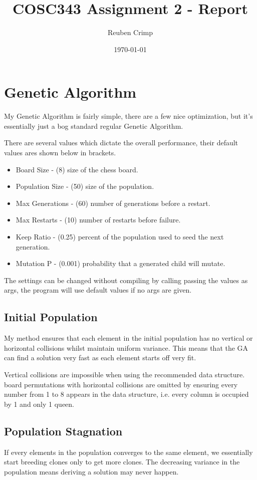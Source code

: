 \documentclass[a4paper,11pt]{article}
\title{COSC343 Assignment 2 - Report}
\author{Reuben Crimp}
\date{\today}
\begin{document}
\maketitle

\section*{Genetic Algorithm}
My Genetic Algorithm is fairly simple, there are a few nice optimization, but it's essentially just a bog standard regular Genetic Algorithm.

There are several values which dictate the overall performance, their default values ares shown below in brackets.
\begin{itemize}
\item Board Size - (8) size of the chess board.
\item Population Size - (50) size of the population.
\item Max Generations - (60) number of generations before a restart.
\item Max Restarts - (10) number of restarts before failure.
\item Keep Ratio - (0.25) percent of the population used to seed the next generation.
\item Mutation P - (0.001) probability that a generated child will mutate.
\end{itemize}

The settings can be changed without compiling by calling passing the values as args, the program will use default values if no args are given.

\subsection*{Initial Population}
My method ensures that each element in the initial population has no vertical or horizontal collisions whilst maintain uniform variance. This means that the GA can find a solution very fast as each element starts off very fit. 

Vertical collisions are impossible when using the recommended data structure. board permutations with horizontal collisions are omitted by ensuring every number from 1 to 8 appears in the data structure, i.e. every column is occupied by 1 and only 1 queen.

\subsection*{Population Stagnation}
If every elements in the population converges to the same element, we essentially start breeding clones only to get more clones. The decreasing variance in the population means deriving a solution may never happen.
\end{document}
